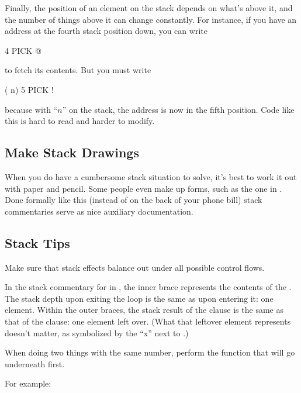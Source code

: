 Finally, the position of an element on the stack depends on what's
above it, and the number of things above it can change constantly. For
instance, if you have an address at the fourth stack position down, you can
write

\begin{Code}
4 PICK @
\end{Code}
to fetch its contents. But you must write

\begin{Code}
( n) 5 PICK !
\end{Code}
because with ``$n$'' on the stack, the address is now in the fifth position.
Code like this is hard to read and harder to modify.%
%
%
%

\subsection{Make Stack Drawings}%

When you do have a cumbersome stack situation to solve, it's best to work
it out with paper and pencil. Some people even make up forms, such as the
one in . Done formally like this (instead of on the back of your
phone bill) stack commentaries serve as nice auxiliary documentation.

\subsection{Stack Tips}

\begin{tip}
Make sure that stack effects balance out under all possible control flows.
\end{tip}
In the stack commentary for  in , the inner
brace represents the contents of the . The stack
depth upon exiting the loop is the same as upon entering it: one element.
Within the outer braces, the stack result of the  clause is the
same as that of the  clause: one element left over. (What
that leftover element represents doesn't matter, as symbolized by the
``x'' next to .)



\begin{tip}
When doing two things with the same number, perform the function that
will go underneath first.
\end{tip}
For example:

